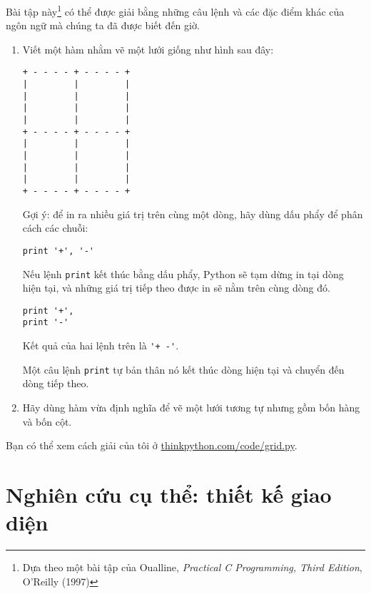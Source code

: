 \documentclass[11pt]{book}
\begin{document}
\begin{ex}
Bài tập này\footnote{Dựa theo một bài tập của Oualline, {\em
    Practical C Programming, Third Edition}, O'Reilly (1997)} có thể
được giải bằng những câu lệnh và các đặc điểm khác của ngôn ngữ mà
chúng ta đã được biết đến giờ.


\begin{enumerate}

\item Viết một hàm nhằm vẽ một lưới giống như hình sau đây:

\beforeverb
\begin{verbatim}
+ - - - - + - - - - +
|         |         |
|         |         |
|         |         |
|         |         |
+ - - - - + - - - - +
|         |         |
|         |         |
|         |         |
|         |         |
+ - - - - + - - - - +
\end{verbatim}
\afterverb
%
Gợi ý: để in ra nhiều giá trị trên cùng một dòng, hãy dùng
dấu phẩy để phân cách các chuỗi:

\beforeverb
\begin{verbatim}
print '+', '-'
\end{verbatim}
\afterverb
%
Nếu lệnh {\tt print} kết thúc bằng dấu phẩy, Python sẽ tạm dừng in
tại dòng hiện tại, và những giá trị tiếp theo được in sẽ 
nằm trên cùng dòng đó.

\beforeverb
\begin{verbatim}
print '+', 
print '-'
\end{verbatim}
\afterverb
%
Kết quả của hai lệnh trên là \verb"'+ -'".

Một câu lệnh {\tt print} tự bản thân nó kết thúc dòng hiện tại
và chuyển đến dòng tiếp theo.

\item Hãy dùng hàm vừa định nghĩa để vẽ một lưới tương tự nhưng gồm bốn hàng
và bốn cột.

\end{enumerate}

Bạn có thể xem cách giải của tôi ở \url{thinkpython.com/code/grid.py}.

\end{ex}





\chapter{Nghiên cứu cụ thể: thiết kế giao diện}
\label{turtlechap}
\end{document}
